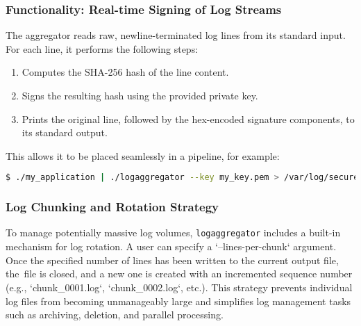 \documentclass[12pt, letterpaper]{article}
\begin{document}
\subsubsection{Functionality: Real-time Signing of Log Streams}
The aggregator reads raw, newline-terminated log lines from its standard input. For each line, it performs the following steps:
\begin{enumerate}
	\item Computes the SHA-256 hash of the line content.
	\item Signs the resulting hash using the provided private key.
	\item Prints the original line, followed by the hex-encoded signature components, to its standard output.
\end{enumerate}
This allows it to be placed seamlessly in a pipeline, for example:
\begin{lstlisting}[language=bash]
	$ ./my_application | ./logaggregator --key my_key.pem > /var/log/secure_app.log
\end{lstlisting}

\subsubsection{Log Chunking and Rotation Strategy}
To manage potentially massive log volumes, \texttt{logaggregator} includes a built-in mechanism for log rotation. A user can specify a `--lines-per-chunk` argument. Once the specified number of lines has been written to the current output file, the\ file is closed, and a new one is created with an incremented sequence number (e.g., `chunk\_0001.log`, `chunk\_0002.log`, etc.). This strategy prevents individual log files from becoming unmanageably large and simplifies log management tasks such as archiving, deletion, and parallel processing.
\end{document}
